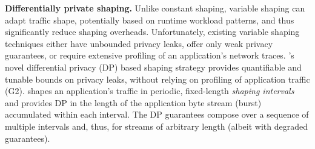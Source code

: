\textbf{Differentially private shaping.}
Unlike constant shaping, variable shaping can adapt traffic shape, potentially
based on runtime workload patterns, and thus significantly reduce shaping
overheads.
{Unfortunately, existing variable shaping techniques either have unbounded
privacy leaks, offer only weak privacy guarantees, or require extensive
profiling of an application's network traces.
}
%
{\sys}'s novel differential privacy (DP) based shaping strategy provides
quantifiable and tunable bounds on privacy leaks, without relying on profiling
of application traffic (G2).
{\sys} shapes an application's traffic in periodic, fixed-length {\em
shaping intervals} and provides DP in the length of the application byte stream
(burst) accumulated within each interval.
The DP guarantees compose over a sequence of multiple intervals and, thus, for
streams of arbitrary length (albeit with
degraded guarantees).
